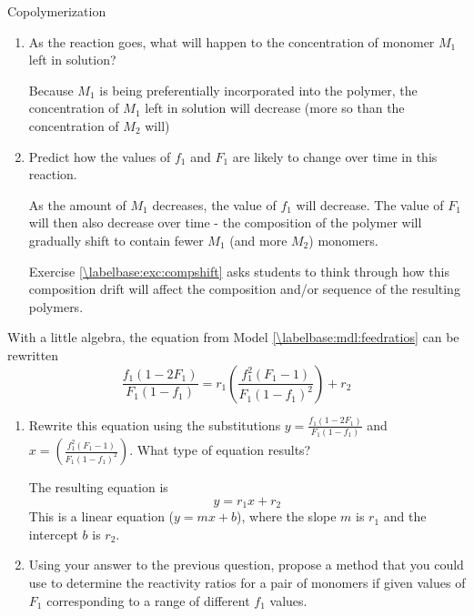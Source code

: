 \begin{activity}{Copolymerization}
\begin{ctqs}
\begin{enumerate}
			\item As the reaction goes, what will happen to the concentration of monomer $M_1$ left in solution?
				
				\begin{solution}[1in]{}
					Because $M_1$ is being preferentially incorporated into the polymer, the concentration of $M_1$ left in solution will decrease (more so than the concentration of $M_2$ will)
				\end{solution}
			\item Predict how the values of $f_1$ and $F_1$ are likely to change over time in this reaction.
				
				\begin{solution}[1in]{}
					As the amount of $M_1$ decreases, the value of $f_1$ will decrease.  The value of $F_1$ will then also decrease over time - the composition of the polymer will gradually shift to contain fewer $M_1$ (and more $M_2$) monomers.
					
					Exercise \ref{\labelbase:exc:compshift} asks students to think through how this composition drift will affect the composition and/or sequence of the resulting polymers.
				\end{solution}
			
			
		\end{enumerate}
		
	\question \label{\labelbase:ctq:FinemanRoss} With a little algebra, the equation from Model \ref{\labelbase:mdl:feedratios} can be rewritten
		\begin{equation*}
			\frac{f_1(1-2F_1)}{F_1(1-f_1)} = r_1\left(\frac{f_1^2(F_1-1)}{F_1(1-f_1)^2}\right)+r_2
		\end{equation*}
		
		\begin{enumerate}
			\item Rewrite this equation using the substitutions $y=\frac{f_1(1-2F_1)}{F_1(1-f_1)}$ and $x=\left(\frac{f_1^2(F_1-1)}{F_1(1-f_1)^2}\right)$.  What type of equation results?
			
				\begin{solution}[1in]{}
					The resulting equation is
					\begin{equation*}
						y = r_1 x + r_2
					\end{equation*}
					This is a linear equation ($y=mx+b$), where the slope $m$ is $r_1$ and the intercept $b$ is $r_2$.
				\end{solution}
			
			\item Using your answer to the previous question, propose a method that you could use to determine the reactivity ratios for a pair of monomers if given values of $F_1$ corresponding to a range of different $f_1$ values.
			

\end{enumerate}
\end{ctqs}
\end{activity}
